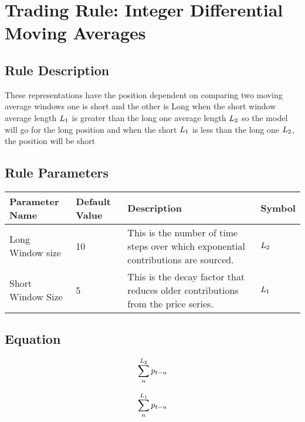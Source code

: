 \documentclass{article}
\begin{document}
\logo
\section*{Trading Rule: Integer Differential Moving Averages}

\subsection{Rule Description}


These representations have the position dependent on comparing two moving average windows one is short and the other is Long when the short window average length $L_{1}$ is greater than the long one average length $L_{2}$ so the model will go for the long position and when the short $L_{1}$ is less than the long one $L_{2}$, the position will be short \\

\subsection{Rule Parameters}
\begin{center}
\begin{tabular}{|m{9em}| m{3em}| m{15em}| m{3em}|}
\hline
Parameter Name & Default Value &	Description & Symbol \\
\hline
Long Window size & 	10	 & This is the number of time steps over which exponential contributions are sourced. & $L_{2}$ \\
\hline
Short Window Size & 	5	 & This is the decay factor that reduces older contributions from the price series. & $L_{1}$ \\
\hline

\end{tabular}
\end{center}

\subsection{Equation}


\begin{equation}
\sum_{n}^{L_{2}} p_{t - n} \\
\label{eq1}
\end{equation}

\begin{equation}
\sum_{n}^{L_{1}} p_{t - n} \\
\label{eq2}
\end{equation}
\end{document}
